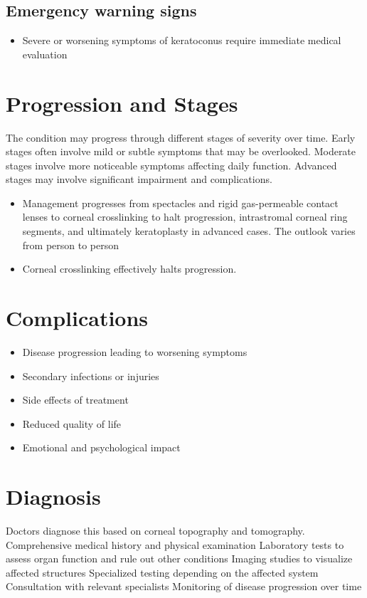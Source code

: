 \subsection{Emergency warning signs}
\begin{itemize}[noitemsep]
  \item Severe or worsening symptoms of keratoconus require immediate medical evaluation
\end{itemize}
\section{Progression and Stages}
The condition may progress through different stages of severity over time. Early stages often involve mild or subtle symptoms that may be overlooked. Moderate stages involve more noticeable symptoms affecting daily function. Advanced stages may involve significant impairment and complications.

\begin{itemize}[noitemsep]
  \item Management progresses from spectacles and rigid gas-permeable contact lenses to corneal crosslinking to halt progression, intrastromal corneal ring segments, and ultimately keratoplasty in advanced cases. The outlook varies from person to person
  \item Corneal crosslinking effectively halts progression.
\end{itemize}
\section{Complications}
\begin{itemize}[noitemsep]
  \item Disease progression leading to worsening symptoms
  \item Secondary infections or injuries
  \item Side effects of treatment
  \item Reduced quality of life
  \item Emotional and psychological impact
\end{itemize}
\section{Diagnosis}
Doctors diagnose this based on corneal topography and tomography. Comprehensive medical history and physical examination Laboratory tests to assess organ function and rule out other conditions Imaging studies to visualize affected structures Specialized testing depending on the affected system Consultation with relevant specialists Monitoring of disease progression over time

